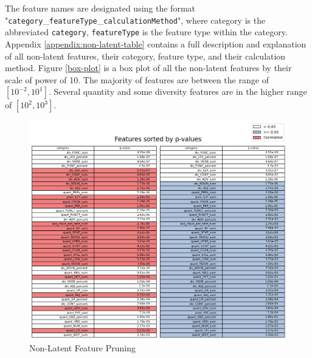 \documentclass{article}
\begin{document}
The feature names are designated using the format "\texttt{category}\_\texttt{featureType}\_\texttt{calculationMethod}", where category is the abbreviated \texttt{category}, \texttt{featureType} is the feature type within the category. Appendix \ref{appendix:non-latent-table} contains a full description and explanation of all non-latent features, their category, feature type, and their calculation method. Figure \ref{box-plot} is a box plot of all the non-latent features by their scale of power of 10. The majority of features are between the range of $[10^{-2}, 10^{1}]$. Several quantity and some diversity features are in the higher range of $[10^2, 10^3]$.

\begin{figure}[h]
  \centering
  \includegraphics[width=\textwidth]{img/non_latent_feat_prune.png}
  \caption{Non-Latent Feature Pruning}
  \label{fig:non-latent-feat-prune}
\end{figure}
\end{document}

